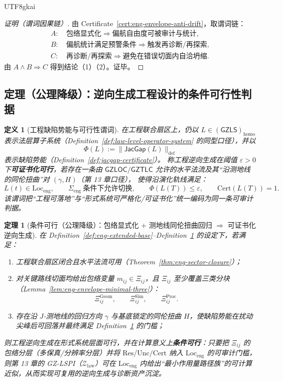 \documentclass[12pt]{article}
\newtheorem{definition}{定义}[section]
\newtheorem{theorem}{定理}[section]
\newcommand{\GZLS}{\ensuremath{\mathsf{GZLS}}}
\newcommand{\GZLOC}{\ensuremath{\mathsf{GZLOC}}}
\newcommand{\GZTLC}{\ensuremath{\mathsf{GZTLC}}}
\newcommand{\JacGap}{\ensuremath{\mathsf{JacGap}}}
\begin{document}
\begin{CJK*}{UTF8}{gkai}
\begin{proof}[证明（谓词因果链）]
由 Certificate~\ref{cert:eng-envelope-anti-drift}，取谓词链：
\[
\begin{aligned}
A:&\ \text{包络显式化}\Rightarrow \text{偏航自由度可被审计与统计},\\
B:&\ \text{偏航统计满足预警条件}\Rightarrow \text{触发再诊断/再探索},\\
C:&\ \text{再诊断/再探索}\Rightarrow \text{避免在错误切面内自洽坍缩}.
\end{aligned}
\]
由 $A\wedge B\Rightarrow C$ 得到结论（1）（2）。证毕。
\end{proof}

\subsection{定理（公理降级）：逆向生成工程设计的条件可行性判据}

\begin{definition}[工程缺陷势能与可行性谓词]
\label{def:eng-feasibility-predicate}
在工程联合扇区上，仍以 $L\in(\GZLS)_{\mathrm{homo}}$ 表示法层算子系统（Definition~\ref{def:law-level-operator-system} 的同型口径），并以
\[
\Phi(L):=\|\JacGap(L)\|_{\mathrm{def}}
\]
表示缺陷势能（Definition~\ref{def:jacgap-certificate}）。
称工程逆向生成在阈值 $\varepsilon>0$ 下\textbf{可证书化可行}，若存在一条由 $\GZLOC/\GZTLC$ 允许的水平法流及其“沿测地线的同伦扭曲”对 $(\gamma,H)$（第 13 章口径），
  使得沿演化轨线满足：
\[
L(t)\in \mathrm{Loc}_{\mathrm{eng}},
\qquad
\Sigma_{\mathrm{eng}}\ \text{条件下允许切换},
\qquad
\Phi(L(T))\le \varepsilon,
\qquad
\mathrm{Cert}(L(T))=1.
\]
该谓词把“工程可落地”与“形式系统可严格化/可证书化”统一编码为同一条可审计判据。
\end{definition}

\begin{theorem}[条件可行（公理降级）：包络显式化 + 测地线同伦扭曲回归 $\Rightarrow$ 可证书化逆向生成]
\label{thm:eng-conditional-feasibility}
在 Definition~\ref{def:eng-extended-base}--Definition~\ref{def:eng-feasibility-predicate} 的设定下，若满足：
\begin{enumerate}
  \item 工程联合扇区闭合且水平法流可用（Theorem~\ref{thm:eng-sector-closure}）；
  \item 对关键路线切面均给出包络变量 $m_{ij}\in\Xi_{ij}$，且 $\Xi_{ij}$ 至少覆盖三类分块（Lemma~\ref{lem:eng-envelope-minimal-three}）：
  \[
  \Xi_{ij}^{\mathrm{Geom}},\qquad
  \Xi_{ij}^{\mathrm{Sim}},\qquad
  \Xi_{ij}^{\mathrm{Proc}}.
  \]
  \item 存在沿 $J$‑测地线的回归方向 $\gamma$ 与基底锁定的同伦扭曲 $H$，使缺陷势能在扰动尖峰后可回落并最终满足 Definition~\ref{def:eng-feasibility-predicate} 的门槛；
\end{enumerate}
则工程逆向生成在形式系统层面可行，并在计算意义上\textbf{条件可行}：只要把 $\Xi_{ij}$ 的包络分层（多保真/分辨率分层）并将 $\mathrm{Res}/\mathrm{Unc}/\mathrm{Cert}$ 纳入
  $\mathrm{Loc}_{\mathrm{eng}}$ 的可审计门槛，则第 13 章的 GZ‑LSPI（$\mathcal{Z}_{\mathrm{law}}$）可在 $\mathrm{Loc}_{\mathrm{eng}}$
  内给出“最小作用量路径族”的可计算近似，从而实现可复用的逆向生成与诊断资产沉淀。
\end{theorem}


\end{CJK*}
\end{document}
